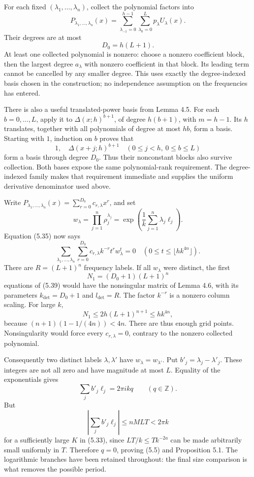 \documentclass[
  11pt,
  a4paper,
]{article}
\begin{document}
For each fixed \((\lambda_1,\ldots,\lambda_n)\), collect the polynomial
factors into \[
P_{\lambda_1,\ldots,\lambda_n}(x)
=\sum_{\lambda_{-1}=0}^{h-1}\sum_{\lambda_0=0}^L
p_\lambda U_\lambda(x).
\] Their degrees are at most \[
D_0=h(L+1).
\] At least one collected polynomial is nonzero: choose a nonzero
coefficient block, then the largest degree \(a_\lambda\) with nonzero
coefficient in that block. Its leading term cannot be cancelled by any
smaller degree. This uses exactly the degree-indexed basis chosen in the
construction; no independence assumption on the frequencies has entered.

There is also a useful translated-power basis from Lemma 4.5. For each
\(b=0,\ldots,L\), apply it to \(\Delta(x;h)^{b+1}\), of degree
\(h(b+1)\), with \(m=h-1\). Its \(h\) translates, together with all
polynomials of degree at most \(hb\), form a basis. Starting with \(1\),
induction on \(b\) proves that \[
1,\quad\Delta(x+j;h)^{b+1}
\quad(0\le j<h,\ 0\le b\le L)
\] form a basis through degree \(D_0\). Thus their nonconstant blocks
also survive collection. Both bases expose the same polynomial-rank
requirement. The degree-indexed family makes that requirement immediate
and supplies the uniform derivative denominator used above.

Write
\(P_{\lambda_1,\ldots,\lambda_n}(x)=\sum_{r=0}^{D_0}c_{r,\lambda}x^r\),
and set \[
w_\lambda=\prod_{j=1}^n\rho_j^{\lambda_j}
=\exp\left(\frac1k\sum_{j=1}^n\lambda_j\ell_j\right).
\] Equation (5.35) now says \[
\sum_{\lambda_1,\ldots,\lambda_n}
\sum_{r=0}^{D_0} c_{r,\lambda}k^{-r}t^r w_\lambda^t=0
\quad(0\le t\le\lfloor hk^{4n}\rfloor). \tag{5.39}
\] There are \(R=(L+1)^n\) frequency labels. If all \(w_\lambda\) were
distinct, the first \[
N_1=(D_0+1)(L+1)^n
\] equations of (5.39) would have the nonsingular matrix of Lemma 4.6,
with its parameters \(k_{\mathrm{det}}=D_0+1\) and
\(l_{\mathrm{det}}=R\). The factor \(k^{-r}\) is a nonzero column
scaling. For large \(k\), \[
N_1\le 2h(L+1)^{n+1}\le hk^{4n},
\] because \((n+1)(1-1/(4n))<4n\). There are thus enough grid points.
Nonsingularity would force every \(c_{r,\lambda}=0\), contrary to the
nonzero collected polynomial.

Consequently two distinct labels \(\lambda,\lambda'\) have
\(w_\lambda=w_{\lambda'}\). Put \(b'_j=\lambda_j-\lambda'_j\). These
integers are not all zero and have magnitude at most \(L\). Equality of
the exponentials gives \[
\sum_j b'_j\ell_j=2\pi i kq\qquad(q\in\mathbb Z).
\] But \[
\left|\sum_jb'_j\ell_j\right|\le nMLT<2\pi k
\] for a sufficiently large \(K\) in (5.33), since \(LT/k\le Tk^{-2a}\)
can be made arbitrarily small uniformly in \(T\). Therefore \(q=0\),
proving (5.5) and Proposition 5.1. The logarithmic branches have been
retained throughout: the final size comparison is what removes the
possible period.
\end{document}
